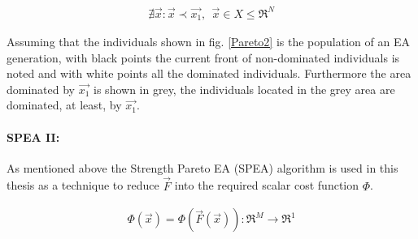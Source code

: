\begin{eqnarray}
    \nexists\vec{x}:\vec{x}\prec\vec{x_1}, ~~ \vec{x}\in X \!\leq\! \Re^{N}
\end{eqnarray}
 

Assuming that the individuals shown in fig. \ref{Pareto2} is the population of an EA generation, with black points the current front of non-dominated individuals is noted and with white points all the dominated individuals. Furthermore the area dominated by $\vec{x_1}$ is shown in grey, the individuals located in the grey area are dominated, at least, by $\vec{x_1}$. 




\paragraph{SPEA II:}
As mentioned above the Strength Pareto EA (SPEA) \cite{ZiTh98} algorithm is used in this thesis as a technique to reduce $\vec{F}$ into the required scalar cost function $\Phi$.    

\begin{eqnarray}
    \Phi(\vec{x})=\Phi(\vec{F}(\vec{x})) :\Re ^M \rightarrow \Re ^1 
\end{eqnarray}

